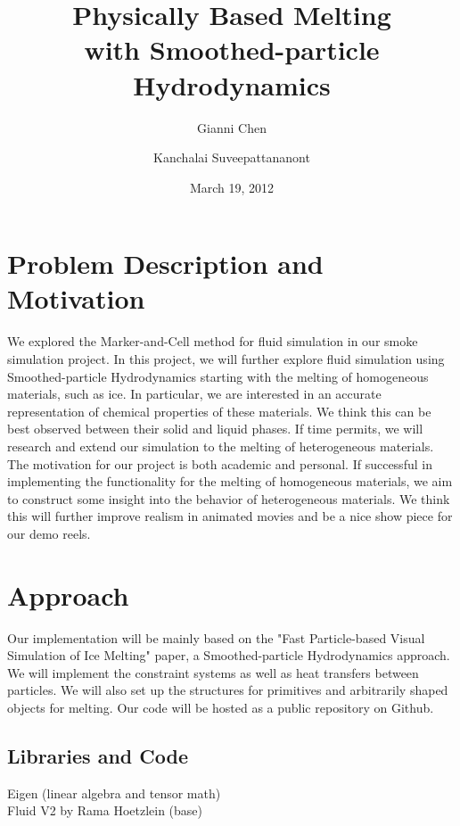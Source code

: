 \documentclass[pdftex,12pt]{article}
\title{Physically Based Melting\\with Smoothed-particle Hydrodynamics}
\author{Gianni Chen \and Kanchalai Suveepattananont}
\date{\small March 19, 2012}
\begin{document}
\maketitle

\section{Problem Description and Motivation}
We explored the Marker-and-Cell method for fluid simulation in our smoke simulation project. In this project, we will further explore fluid simulation using Smoothed-particle Hydrodynamics starting with the melting of homogeneous materials, such as ice. In particular, we are interested in an accurate representation of chemical properties of these materials. We think this can be best observed between their solid and liquid phases. If time permits, we will research and extend our simulation to the melting of heterogeneous materials. \\

The motivation for our project is both academic and personal. If successful in implementing the functionality for the melting of homogeneous materials, we aim to construct some insight into the behavior of heterogeneous materials. We think this will further improve realism in animated movies and be a nice show piece for our demo reels.

\section{Approach}
Our implementation will be mainly based on the "Fast Particle-based Visual Simulation of Ice Melting" paper, a Smoothed-particle Hydrodynamics approach. We will implement the constraint systems as well as heat transfers between particles. We will also set up the structures for primitives and arbitrarily shaped objects for melting. Our code will be hosted as a public repository on Github.

    \subsection{Libraries and Code}
    Eigen (linear algebra and tensor math) \\
    Fluid V2 by Rama Hoetzlein (base)
\end{document}
